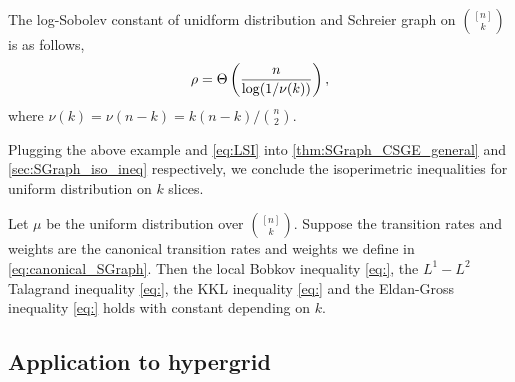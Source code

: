 \begin{theorem}
    The log-Sobolev constant of unidform distribution and Schreier graph on $\binom{[n]}{k}$ is as follows,
    $$
        \rho = \Theta\left(\frac n{\log(1/\nu(k))}\right),
    $$
    where $\nu(k) = \nu(n-k) = k(n-k)/\binom{n}2$.
\end{theorem}
Plugging the above example and \ref{eq:LSI} into \cref{thm:SGraph_CSGE_general} and \cref{sec:SGraph_iso_ineq} respectively, we conclude the isoperimetric inequalities for uniform distribution on $k$ slices.
\begin{theorem}\label{thm:k_slice_isoperimetric}
    Let $\mu$ be the uniform distribution over $\binom{[n]}k$.
    Suppose the transition rates and weights are the canonical transition rates and weights we define in \eqref{eq:canonical_SGraph}.
    Then the local Bobkov inequality \eqref{eq:}, the $L^1-L^2$ Talagrand inequality \eqref{eq:}, the KKL inequality \eqref{eq:} and the Eldan-Gross inequality \eqref{eq:} holds with constant depending on $k$.
\end{theorem}


\subsection{Application to hypergrid}

